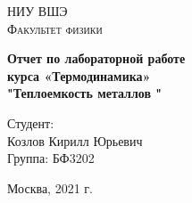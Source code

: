 \documentclass[14pt,a4paper, article,oneside]{extarticle}
\begin{document}
\renewcommand{\chaptername}{Лабораторная работа}
\def\contentsname{Содержание}

	\begin{titlepage}
		\begin{center}
			\textsc{НИУ ВШЭ\\[5mm]
				Факультет физики}
			
			\vfill
			\textbf{Отчет по лабораторной работе \\[3mm]
				курса «Термодинамика»\\[6mm]
				"Теплоемкость металлов "
				\\[70mm]
			}
			
		\end{center}
		
		\hfill
		\begin{minipage}{.4\textwidth}
			Студент:\\[2mm] 
			Козлов Кирилл Юрьевич\\
			Группа: БФ3202\\[5mm]
			
			
			
		\end{minipage}
		\vfill
		\begin{center}
			Москва, 2021 г.
		\end{center}
	\end{titlepage}
	
	
	\tableofcontents
	\newpage
	
	
	
\end{document}
